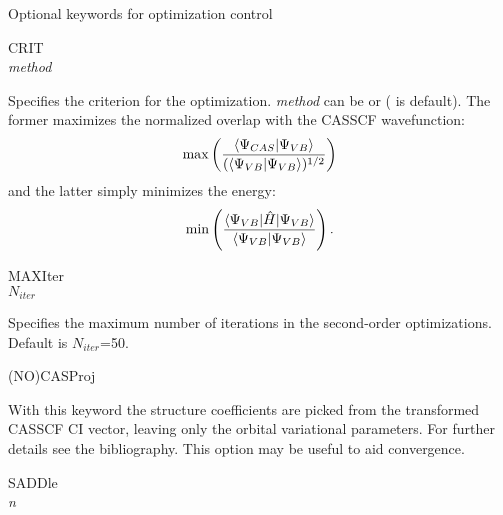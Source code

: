 Optional keywords for optimization control
\begin{keywordlist}
\item[CRIT]
\\
{\em method\/}

Specifies the criterion for the optimization. {\em method\/} can be  or 
( is default).
The former maximizes the normalized overlap with the CASSCF wavefunction:
\[
{\rm max}\left(\frac{\langle\Psi_{CAS}|\Psi_{VB}\rangle}{(\langle\Psi_{VB}|\Psi_{VB}\rangle)^{1/2}}\right)
\]
and the latter simply minimizes the energy:
\[
{\rm min}\left(\frac{\langle\Psi_{VB}|\hat{H}|\Psi_{VB}\rangle}{\langle\Psi_{VB}|\Psi_{VB}\rangle}\right).
\]
\item[MAXIter]
\\
{$N_{iter}$}

Specifies the maximum number of iterations in the second-order optimizations. Default is $N_{iter}$=50.
\item[(NO)CASProj]
%


With this keyword the structure coefficients are picked from the transformed CASSCF CI vector, leaving
only the orbital variational parameters. For further details see the bibliography.
This option may be useful to aid convergence.
\item[SADDle]
\\
{\em n}


\end{keywordlist}
